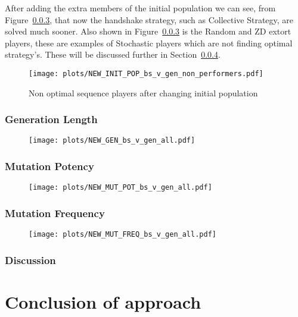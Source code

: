 After adding the extra members of the initial population we can see, from Figure~\ref{}, that now the handshake strategy, such as Collective Strategy, are solved much sooner.
Also shown in Figure~\ref{} is the Random and ZD extort players, these are examples of Stochastic players which are not finding optimal strategy's.
These will be discussed further in Section~\ref{subsubsec:discussion}.
\begin{figure}[ht] 
    \texttt{[image: plots/NEW\_INIT\_POP\_bs\_v\_gen\_non\_performers.pdf]}
    \caption{Non optimal sequence players after changing initial population}\label{fig:NEW-INIT-POP-bs-v-gen-non-performers}
\end{figure}

\subsubsection{Generation Length}
\begin{figure}[ht] 
    \texttt{[image: plots/NEW\_GEN\_bs\_v\_gen\_all.pdf]}
    \caption{}\label{fig:NEW-GEN-bs-v-gen-all}
\end{figure}

\subsubsection{Mutation Potency}
\begin{figure}[ht] 
    \texttt{[image: plots/NEW\_MUT\_POT\_bs\_v\_gen\_all.pdf]}
    \caption{}\label{fig:NEW-MUT-POT-bs-v-gen-all}
\end{figure}

\subsubsection{Mutation Frequency}
\begin{figure}[ht] 
    \texttt{[image: plots/NEW\_MUT\_FREQ\_bs\_v\_gen\_all.pdf]}
    \caption{}\label{fig:NEW-MUT-FREQ-bs-gen-all}
\end{figure}
\subsubsection{Discussion}\label{subsubsec:discussion}

\section{Conclusion of approach}\label{sec:conclusionOfApproach}